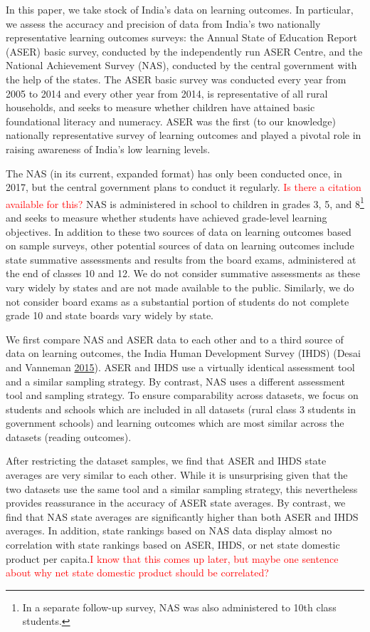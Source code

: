 \documentclass[
  11pt,
]{article}
\begin{document}
In this paper, we take stock of India's data on learning outcomes. In particular, we assess the accuracy and precision of data from India's two nationally representative learning outcomes surveys: the Annual State of Education Report (ASER) basic survey, conducted by the independently run ASER Centre, and the National Achievement Survey (NAS), conducted by the central government with the help of the states. The ASER basic survey was conducted every year from 2005 to 2014 and every other year from 2014, is representative of all rural households, and seeks to measure whether children have attained basic foundational literacy and numeracy. ASER was the first (to our knowledge) nationally representative survey of learning outcomes and played a pivotal role in raising awareness of India's low learning levels.

The NAS (in its current, expanded format) has only been conducted once, in 2017, but the central government plans to conduct it regularly. \textcolor{red}{Is there a citation available for this?} NAS is administered in school to children in grades 3, 5, and 8\footnote{In a separate follow-up survey, NAS was also administered to 10th class students.} and seeks to measure whether students have achieved grade-level learning objectives. In addition to these two sources of data on learning outcomes based on sample surveys, other potential sources of data on learning outcomes include state summative assessments and results from the board exams, administered at the end of classes 10 and 12. We do not consider summative assessments as these vary widely by states and are not made available to the public. Similarly, we do not consider board exams as a substantial portion of students do not complete grade 10 and state boards vary widely by state.

We first compare NAS and ASER data to each other and to a third source of data on learning outcomes, the India Human Development Survey (IHDS) (Desai and Vanneman \protect\hyperlink{ref-desai2015india}{2015}). ASER and IHDS use a virtually identical assessment tool and a similar sampling strategy. By contrast, NAS uses a different assessment tool and sampling strategy. To ensure comparability across datasets, we focus on students and schools which are included in all datasets (rural class 3 students in government schools) and learning outcomes which are most similar across the datasets (reading outcomes).

After restricting the dataset samples, we find that ASER and IHDS state averages are very similar to each other. While it is unsurprising given that the two datasets use the same tool and a similar sampling strategy, this nevertheless provides reassurance in the accuracy of ASER state averages. By contrast, we find that NAS state averages are significantly higher than both ASER and IHDS averages. In addition, state rankings based on NAS data display almost no correlation with state rankings based on ASER, IHDS, or net state domestic product per capita.\textcolor{red}{I know that this comes up later, but maybe one sentence about why net state domestic product should be correlated?}
\end{document}
